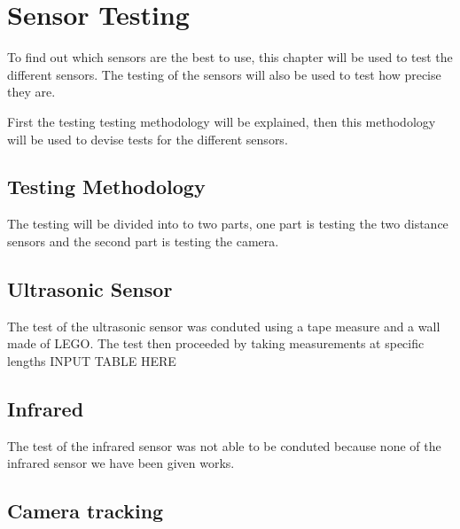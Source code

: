 \section{Sensor Testing}
To find out which sensors are the best to use, this chapter will be used to test
the different sensors. The testing of the sensors will also be used to test how
precise they are.\nl

First the testing testing methodology will be explained, then this methodology
will be used to devise tests for the different sensors. 

\subsection{Testing Methodology}
The testing will be divided into to two parts, one part is testing the two
distance sensors and the second part is testing the camera. 

\subsection{Ultrasonic Sensor}
The test of the ultrasonic sensor was conduted using a tape measure and a wall
made of LEGO. The test then proceeded by taking measurements at specific
lengths 
{INPUT TABLE HERE}

\subsection{Infrared}
The test of the infrared sensor was not able to be conduted because none of the
infrared sensor we have been given works. 

\subsection{Camera tracking}%